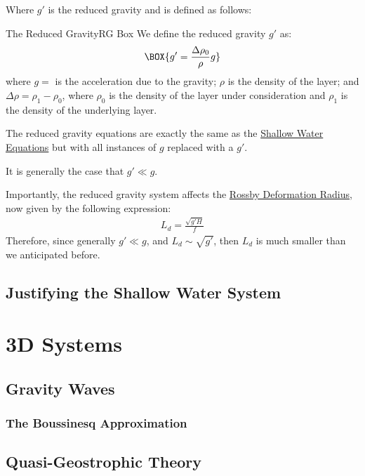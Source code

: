 Where $g'$ is the reduced gravity and is defined as follows:

\begin{fact}{The Reduced Gravity}{RG Box}\label{RG Box}
    We define the reduced gravity $g'$ as:
    \begin{align}
        \BOX{g'=\frac{\Delta \rho_0}{\rho}g}
    \end{align}
    where $g=$ is the acceleration due to the gravity; $\rho$ is the density of the layer; and $\Delta \rho = \rho_1-\rho_0$, where $\rho_0$ is the density of the layer under consideration and $\rho_1$ is the density of the underlying layer.

    The reduced gravity equations are exactly the same as the \hyperref[shallow box]{Shallow Water Equations} but with all instances of $g$ replaced with a $g'$.

    It is generally the case that $g'\ll g$. 
\end{fact}

Importantly, the reduced gravity system affects the \hyperref[SW Def Radius Box]{Rossby Deformation Radius}, now given by the following expression:
\begin{align*}
    L_d = \frac{\sqrt{g' H}}{f}
\end{align*}
Therefore, since generally $g'\ll g$, and $L_d\sim\sqrt{g'}$, then $L_d$ is much smaller than we anticipated before.

\section{Justifying the Shallow Water System}\label{SW Justification}

\chapter{3D Systems}\label{3D Systems}

\section{Gravity Waves}

\subsection{The Boussinesq Approximation}

\section{Quasi-Geostrophic Theory}

